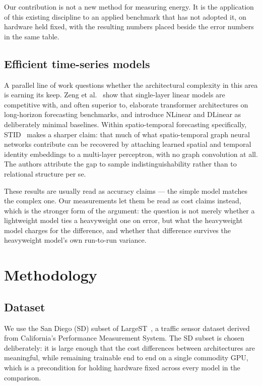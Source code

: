 \documentclass[manuscript,screen,review]{acmart}
\begin{document}
Our contribution is not a new method for measuring energy. It is the
application of this existing discipline to an applied benchmark that has not
adopted it, on hardware held fixed, with the resulting numbers placed beside
the error numbers in the same table.

\subsection{Efficient time-series models}
A parallel line of work questions whether the architectural complexity in this
area is earning its keep. Zeng et al.~\cite{zeng2023transformers} show that
single-layer linear models are competitive with, and often superior to,
elaborate transformer architectures on long-horizon forecasting benchmarks,
and introduce NLinear and DLinear as deliberately minimal baselines. Within
spatio-temporal forecasting specifically, STID~\cite{shao2022stid} makes a
sharper claim: that much of what spatio-temporal graph neural networks
contribute can be recovered by attaching learned spatial and temporal identity
embeddings to a multi-layer perceptron, with no graph convolution at all. The
authors attribute the gap to sample indistinguishability rather than to
relational structure per se.

These results are usually read as accuracy claims --- the simple model matches
the complex one. Our measurements let them be read as cost claims instead,
which is the stronger form of the argument: the question is not merely whether
a lightweight model ties a heavyweight one on error, but what the heavyweight
model charges for the difference, and whether that difference survives the
heavyweight model's own run-to-run variance.

\section{Methodology}
\subsection{Dataset}
We use the San Diego (SD) subset of LargeST~\cite{liu2023largest}, a traffic
sensor dataset derived from California's Performance Measurement System. The
SD subset is chosen deliberately: it is large enough that the cost differences
between architectures are meaningful, while remaining trainable end to end on
a single commodity GPU, which is a precondition for holding hardware fixed
across every model in the comparison.
\end{document}
